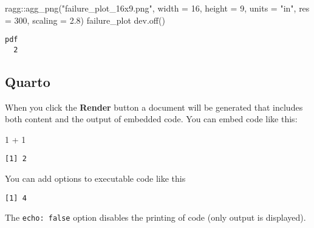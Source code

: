 \documentclass[
  letterpaper,
  DIV=11,
  numbers=noendperiod]{scrartcl}
\newenvironment{Shaded}{\begin{snugshade}}{\end{snugshade}}
\newcommand{\AttributeTok}[1]{\textcolor[rgb]{0.40,0.46,0.14}{#1}}
\newcommand{\DecValTok}[1]{\textcolor[rgb]{0.68,0.00,0.00}{#1}}
\newcommand{\FloatTok}[1]{\textcolor[rgb]{0.68,0.00,0.00}{#1}}
\newcommand{\FunctionTok}[1]{\textcolor[rgb]{0.28,0.35,0.67}{#1}}
\newcommand{\NormalTok}[1]{\textcolor[rgb]{0.00,0.46,0.62}{#1}}
\newcommand{\SpecialCharTok}[1]{\textcolor[rgb]{0.37,0.37,0.37}{#1}}
\newcommand{\StringTok}[1]{\textcolor[rgb]{0.13,0.47,0.30}{#1}}
\begin{document}
\begin{Shaded}
\begin{Highlighting}[]
\NormalTok{ragg}\SpecialCharTok{::}\FunctionTok{agg\_png}\NormalTok{(}\StringTok{"failure\_plot\_16x9.png"}\NormalTok{, }\AttributeTok{width =} \DecValTok{16}\NormalTok{, }\AttributeTok{height =} \DecValTok{9}\NormalTok{, }\AttributeTok{units =} \StringTok{"in"}\NormalTok{, }\AttributeTok{res =} \DecValTok{300}\NormalTok{, }\AttributeTok{scaling =} \FloatTok{2.8}\NormalTok{)}
\NormalTok{failure\_plot}
\FunctionTok{dev.off}\NormalTok{()}
\end{Highlighting}
\end{Shaded}

\begin{verbatim}
pdf 
  2 
\end{verbatim}

\hypertarget{quarto}{%
\subsection{Quarto}\label{quarto}}

When you click the \textbf{Render} button a document will be generated
that includes both content and the output of embedded code. You can
embed code like this:

\begin{Shaded}
\begin{Highlighting}[]
\DecValTok{1} \SpecialCharTok{+} \DecValTok{1}
\end{Highlighting}
\end{Shaded}

\begin{verbatim}
[1] 2
\end{verbatim}

You can add options to executable code like this

\begin{verbatim}
[1] 4
\end{verbatim}

The \texttt{echo:\ false} option disables the printing of code (only
output is displayed).
\end{document}

